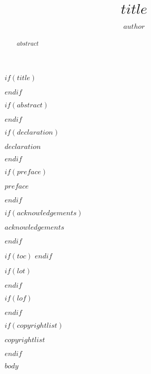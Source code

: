\documentclass[11pt,a4paper,titlepage,twoside,openright]{style/unimelbthesis}
\title{$title$}
\author{$author$}
\begin{document}

\begin{frontmatter}


$if(title)$
  \maketitle
$endif$


$if(abstract)$
  \begin{abstract}
    $abstract$
  \end{abstract}
$endif$


$if(declaration)$
  \begin{declaration}
    $declaration$
  \end{declaration}
$endif$


$if(preface)$
  \begin{preface}
    $preface$
  \end{preface}
$endif$


$if(acknowledgements)$
  \begin{acknowledgements}
    $acknowledgements$
  \end{acknowledgements}
$endif$


$if(toc)$
  \hypersetup{linkcolor=$if(toccolor)$$toccolor$$else$black$endif$}
  \setcounter{tocdepth}{$toc-depth$}
  \tableofcontents
$endif$


$if(lot)$
  \listoftables
$endif$


$if(lof)$
  \listoffigures
$endif$


$if(copyrightlist)$
  \begin{copyrightlist}
    $copyrightlist$
  \end{copyrightlist}
$endif$

\end{frontmatter}

%


\begin{mainmatter}

$body$

\end{mainmatter}
\end{document}

